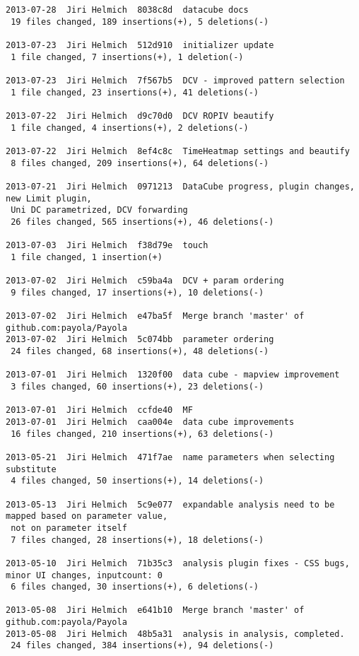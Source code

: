 {\begin{verbatim}
2013-07-28  Jiri Helmich  8038c8d  datacube docs
 19 files changed, 189 insertions(+), 5 deletions(-)

2013-07-23  Jiri Helmich  512d910  initializer update
 1 file changed, 7 insertions(+), 1 deletion(-)

2013-07-23  Jiri Helmich  7f567b5  DCV - improved pattern selection
 1 file changed, 23 insertions(+), 41 deletions(-)

2013-07-22  Jiri Helmich  d9c70d0  DCV ROPIV beautify
 1 file changed, 4 insertions(+), 2 deletions(-)

2013-07-22  Jiri Helmich  8ef4c8c  TimeHeatmap settings and beautify
 8 files changed, 209 insertions(+), 64 deletions(-)

2013-07-21  Jiri Helmich  0971213  DataCube progress, plugin changes, new Limit plugin,
 Uni DC parametrized, DCV forwarding
 26 files changed, 565 insertions(+), 46 deletions(-)

2013-07-03  Jiri Helmich  f38d79e  touch
 1 file changed, 1 insertion(+)

2013-07-02  Jiri Helmich  c59ba4a  DCV + param ordering
 9 files changed, 17 insertions(+), 10 deletions(-)

2013-07-02  Jiri Helmich  e47ba5f  Merge branch 'master' of github.com:payola/Payola
2013-07-02  Jiri Helmich  5c074bb  parameter ordering
 24 files changed, 68 insertions(+), 48 deletions(-)

2013-07-01  Jiri Helmich  1320f00  data cube - mapview improvement
 3 files changed, 60 insertions(+), 23 deletions(-)

2013-07-01  Jiri Helmich  ccfde40  MF
2013-07-01  Jiri Helmich  caa004e  data cube improvements
 16 files changed, 210 insertions(+), 63 deletions(-)

2013-05-21  Jiri Helmich  471f7ae  name parameters when selecting substitute
 4 files changed, 50 insertions(+), 14 deletions(-)

2013-05-13  Jiri Helmich  5c9e077  expandable analysis need to be mapped based on parameter value,
 not on parameter itself
 7 files changed, 28 insertions(+), 18 deletions(-)

2013-05-10  Jiri Helmich  71b35c3  analysis plugin fixes - CSS bugs, minor UI changes, inputcount: 0
 6 files changed, 30 insertions(+), 6 deletions(-)

2013-05-08  Jiri Helmich  e641b10  Merge branch 'master' of github.com:payola/Payola
2013-05-08  Jiri Helmich  48b5a31  analysis in analysis, completed.
 24 files changed, 384 insertions(+), 94 deletions(-)


\end{verbatim}}

